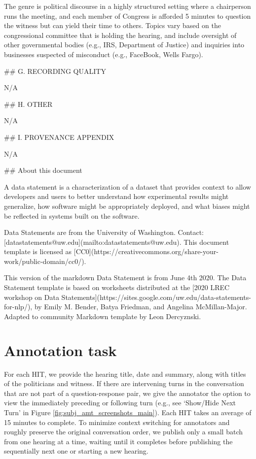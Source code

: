 The genre is political discourse in a highly structured setting where a chairperson runs the meeting, and each member of Congress is afforded 5 minutes to question the witness but can yield their time to others. Topics vary based on the congressional committee that is holding the hearing, and include oversight of other governmental bodies (e.g., IRS, Department of Justice) and inquiries into businesses suspected of misconduct (e.g., FaceBook, Wells Fargo).

\#\# G. RECORDING QUALITY

N/A

\#\# H. OTHER

N/A

\#\# I. PROVENANCE APPENDIX

N/A

\#\# About this document

A data statement is a characterization of a dataset that provides context to allow developers and users to better understand how experimental results might generalize, how software might be appropriately deployed, and what biases might be reflected in systems built on the software.

Data Statements are from the University of Washington. Contact: [datastatements@uw.edu](mailto:datastatements@uw.edu). This document template is licensed as [CC0](https://creativecommons.org/share-your-work/public-domain/cc0/).

This version of the markdown Data Statement is from June 4th 2020. The Data Statement template is based on worksheets distributed at the [2020 LREC workshop on Data Statements](https://sites.google.com/uw.edu/data-statements-for-nlp/), by Emily M. Bender, Batya Friedman, and Angelina McMillan-Major. Adapted to community Markdown template by Leon Dercyznski.

\section{Annotation task}
\label{sec:app_anno}

For each HIT, we provide the hearing title, date and summary, along with titles of the politicians and witness. If there are intervening turns in the conversation that are not part of a question-response pair, we give the annotator the option to view the immediately preceding or following turn (e.g., see `Show/Hide Next Turn' in Figure \ref{fig:subj_amt_screenshots_main}). Each HIT takes an average of 15 minutes to complete. To minimize context switching for annotators and roughly preserve the original conversation order, we publish only a small batch from one hearing at a time, waiting until it completes before publishing the sequentially next one or starting a new hearing.



